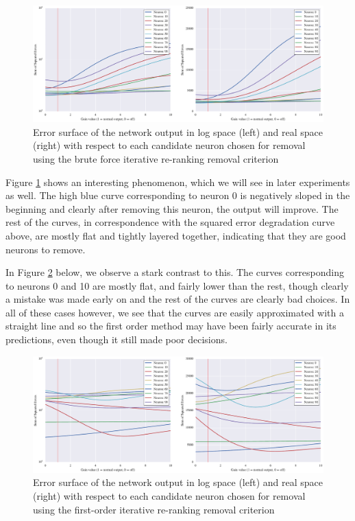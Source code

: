 \begin{figure}[!ht]
\centering
\includegraphics[width=\linewidth]{mnist-test-single-digit-0-gt.pdf}
\caption{Error surface of the network output in log space (left) and real space (right) with respect to each candidate neuron chosen for removal using the brute force iterative re-ranking removal criterion}
\label{fig:mnist-test-single-digit-0-gt}
\end{figure}

Figure \ref{fig:mnist-test-single-digit-0-gt} shows an interesting phenomenon, which we will see in later experiments as well. The high blue curve corresponding to neuron 0 is negatively sloped in the beginning and clearly after removing this neuron, the output will improve. The rest of the curves, in correspondence with the squared error degradation curve above, are mostly flat and tightly layered together, indicating that they are good neurons to remove. 

In Figure \ref{fig:mnist-test-single-digit-0-g1} below, we observe a stark contrast to this. The curves corresponding to neurons 0 and 10 are mostly flat, and fairly lower than the rest, though clearly a mistake was made early on and the rest of the curves are clearly bad choices. In all of these cases however, we see that the curves are easily approximated with a straight line and so the first order method may have been fairly accurate in its predictions, even though it still made poor decisions. 

\begin{figure}[!ht]
\centering
\includegraphics[width=\linewidth]{mnist-test-single-digit-0-g1.pdf}
\caption{Error surface of the network output in log space (left) and real space (right) with respect to each candidate neuron chosen for removal using the first-order iterative re-ranking removal criterion}
\label{fig:mnist-test-single-digit-0-g1}
\end{figure}

